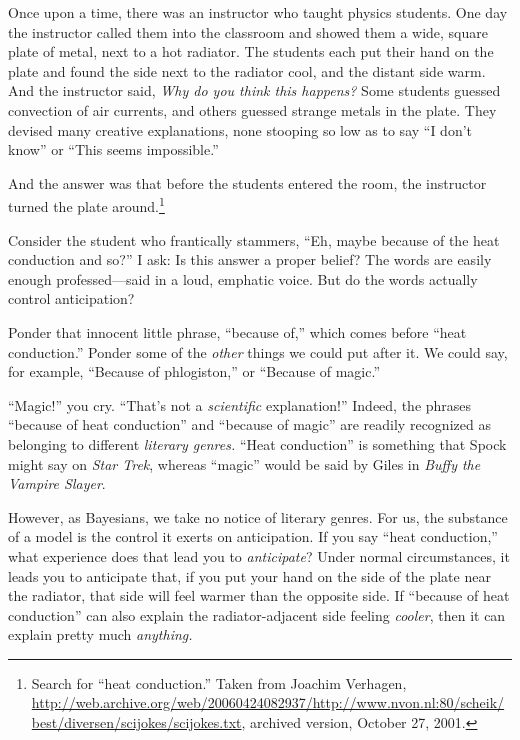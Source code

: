 
{
 Once upon a time, there was an instructor who taught physics
students. One day the instructor called them into the classroom and
showed them a wide, square plate of metal, next to a hot radiator. The
students each put their hand on the plate and found the side next to
the radiator cool, and the distant side warm. And the instructor said,
\textit{Why do you think this happens?} Some students guessed
convection of air currents, and others guessed strange metals in the
plate. They devised many creative explanations, none stooping so low as
to say ``I don't
know'' or ``This seems
impossible.'' }

{
 And the answer was that before the students entered the room, the
instructor turned the plate around.\footnote{Search for ``heat
conduction.'' Taken from Joachim Verhagen,
\url{http://web.archive.org/web/20060424082937/http://www.nvon.nl:80/scheik/best/diversen/scijokes/scijokes.txt},
archived version, October 27, 2001.
}
}

{
 Consider the student who frantically stammers,
``Eh, maybe because of the heat conduction and
so?'' I ask: Is this answer a proper belief? The
words are easily enough professed---said in a loud, emphatic voice. But
do the words actually control anticipation?}

{
 Ponder that innocent little phrase, ``because
of,'' which comes before ``heat
conduction.'' Ponder some of the \textit{other}
things we could put after it. We could say, for example,
``Because of phlogiston,'' or
``Because of magic.''}

{
 ``Magic!'' you cry.
``That's not a \textit{scientific}
explanation!'' Indeed, the phrases
``because of heat conduction'' and
``because of magic'' are readily
recognized as belonging to different \textit{literary genres.}
``Heat conduction'' is something
that Spock might say on \textit{Star Trek}, whereas
``magic'' would be said by Giles in
\textit{Buffy the Vampire Slayer}.}

{
 However, as Bayesians, we take no notice of literary genres. For
us, the substance of a model is the control it exerts on anticipation.
If you say ``heat conduction,'' what
experience does that lead you to \textit{anticipate}? Under normal
circumstances, it leads you to anticipate that, if you put your hand on
the side of the plate near the radiator, that side will feel warmer
than the opposite side. If ``because of heat
conduction'' can also explain the radiator-adjacent
side feeling \textit{cooler}, then it can explain pretty much
\textit{anything.}}

